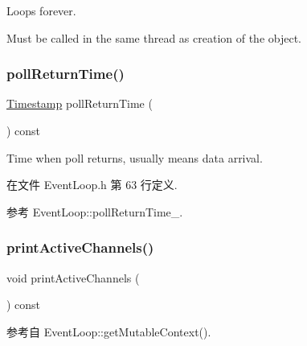 Loops forever.

Must be called in the same thread as creation of the object. \mbox{\label{classmuduo_1_1net_1_1EventLoop_a5c4a9a6cf52fc408cdd33c8445fb5127}} 
\subsubsection{\texorpdfstring{poll\+Return\+Time()}{pollReturnTime()}}
{\footnotesize\ttfamily \hyperlink{classmuduo_1_1Timestamp}{Timestamp} poll\+Return\+Time (\begin{DoxyParamCaption}{ }\end{DoxyParamCaption}) const\hspace{0.3cm}{\ttfamily [inline]}}

Time when poll returns, usually means data arrival. 

在文件 Event\+Loop.\+h 第 63 行定义.



参考 Event\+Loop\+::poll\+Return\+Time\+\_\+.

\mbox{\label{classmuduo_1_1net_1_1EventLoop_aab9db454f555ffd9944fcd782e334d89}} 
\subsubsection{\texorpdfstring{print\+Active\+Channels()}{printActiveChannels()}}
{\footnotesize\ttfamily void print\+Active\+Channels (\begin{DoxyParamCaption}{ }\end{DoxyParamCaption}) const\hspace{0.3cm}{\ttfamily [private]}}



参考自 Event\+Loop\+::get\+Mutable\+Context().

